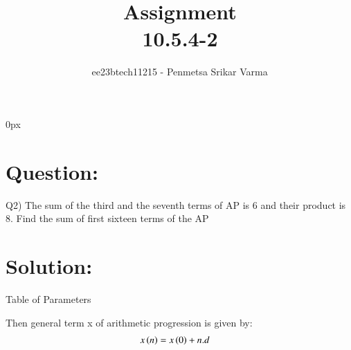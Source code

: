 \documentclass[beamer]{IEEEtran}
\theoremstyle{remark}
\begin{document}
\parindent 0px


\title{Assignment\\[1ex]10.5.4-2}
\author{ee23btech11215 - Penmetsa Srikar Varma$^{}$%
}
\maketitle
\newpage
\bigskip

\renewcommand{\thefigure}{\theenumi}
\renewcommand{\thetable}{\theenumi}
\section*{Question:}
Q2) The sum of the third and the seventh terms of AP is 6 and their product is 8. Find the sum of first sixteen terms of the AP\\
\section*{Solution:}
{
\centering
Table of Parameters\\
}
\begin{table}[h]
    \centering
    
    \label{tab:my_label}
\end{table}

Then general term x of arithmetic progression is given by:
\begin{align}
\label{q1}
x\left(n\right)&=x\left(0\right)+n.d
\end{align}
 
\end{document}
